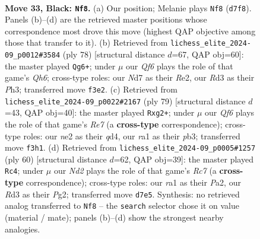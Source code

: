 \documentclass[11pt]{article}
\begin{document}
\clearpage

\begin{figure}[p]\centering
\begin{subfigure}{0.46\textwidth}\centering
\resizebox{\linewidth}{!}{%
\newchessgame
\chessboard[
  setfen={2Q5/pp1n2kp/7p/1P6/3P4/3r1q2/4N3/R5KR b - - 2 33},
  showmover=false,
  pgfstyle=straightmove, color=movearrow, markmove={d7-f8}
]}
\caption{}
\end{subfigure}\hfill
\begin{subfigure}{0.46\textwidth}\centering
\resizebox{\linewidth}{!}{%
\newchessgame
\chessboard[
  setfen={5rk1/p1p5/Pp5Q/1q2N3/3P4/7P/4RP2/6K1 w - - 3 40},
  showmover=false,
  pgfstyle=straightmove, color=movearrow, markmove={h6-g6}
]}
\caption{}
\end{subfigure}
\\[4pt]
\begin{subfigure}{0.46\textwidth}\centering
\resizebox{\linewidth}{!}{%
\newchessgame
\chessboard[
  setfen={6k1/2p2pp1/6p1/6Nq/3Q4/pP5P/P3r1R1/6K1 b - - 0 40},
  showmover=false,
  pgfstyle=straightmove, color=movearrow, markmove={e2-g2}
]}
\caption{}
\end{subfigure}\hfill
\begin{subfigure}{0.46\textwidth}\centering
\resizebox{\linewidth}{!}{%
\newchessgame
\chessboard[
  setfen={5r1k/1pR1r3/p6p/3Pq3/8/7P/PPQ2PP1/6K1 w - - 4 31},
  showmover=false,
  pgfstyle=straightmove, color=movearrow, markmove={c7-c4}
]}
\caption{}
\end{subfigure}
\caption{\textbf{Move 33, Black: \texttt{Nf8}.} (a) Our position; Melanie plays \texttt{Nf8} (\texttt{d7f8}). Panels (b)--(d) are the retrieved master positions whose correspondence most drove this move (highest QAP objective among those that transfer to it). (b) Retrieved from \texttt{lichess\_elite\_2024-09\_p0012\#3584} (ply 78) [structural distance $d$=67, QAP obj=60]: the master played \texttt{Qg6+}; under $\mu$ our \emph{Qf6} plays the role of that game's \emph{Qh6}; cross-type roles: our \emph{N}d7 as their \emph{R}e2, our \emph{R}d3 as their \emph{P}h3; transferred move \texttt{f3e2}. (c) Retrieved from \texttt{lichess\_elite\_2024-09\_p0022\#2167} (ply 79) [structural distance $d$=43, QAP obj=40]: the master played \texttt{Rxg2+}; under $\mu$ our \emph{Qf6} plays the role of that game's \emph{Re7} (a \textbf{cross-type} correspondence); cross-type roles: our \emph{n}e2 as their \emph{q}d4, our \emph{r}a1 as their \emph{p}b3; transferred move \texttt{f3h1}. (d) Retrieved from \texttt{lichess\_elite\_2024-09\_p0005\#1257} (ply 60) [structural distance $d$=62, QAP obj=39]: the master played \texttt{Rc4}; under $\mu$ our \emph{Nd2} plays the role of that game's \emph{Rc7} (a \textbf{cross-type} correspondence); cross-type roles: our \emph{r}a1 as their \emph{P}a2, our \emph{R}d3 as their \emph{P}g2; transferred move \texttt{d7e5}. Synthesis: no retrieved analog transferred to \texttt{Nf8} -- the \texttt{search} selector chose it on value (material / mate); panels (b)--(d) show the strongest nearby analogies.}
\label{fig:thought-m65}
\end{figure}
\end{document}
